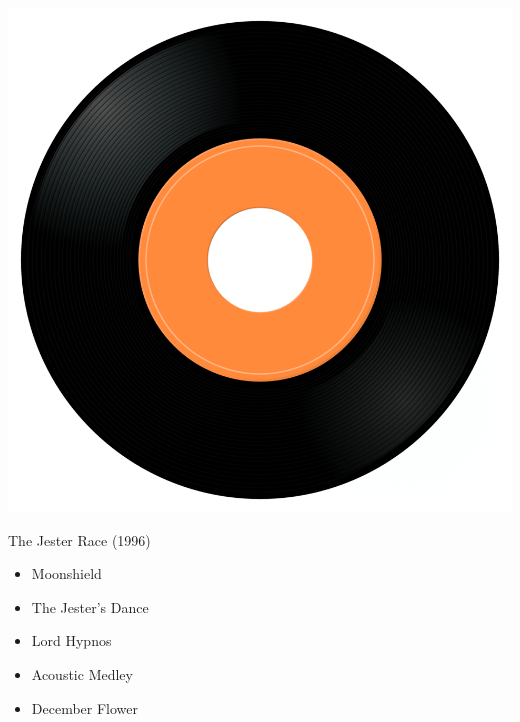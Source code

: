 \begin{minipage}[t]{0.25\textwidth}\vspace{0pt}
\captionsetup{type=figure}
\includegraphics[width=\textwidth]{Images/cover.png}
\caption*{The Jester Race (1996)}
\end{minipage}
\begin{minipage}[t]{0.25\textwidth}\vspace{0pt}
\begin{itemize}[nosep,leftmargin=1em,labelwidth=*,align=left]
	\setlength{\itemsep}{0pt}
	\item Moonshield
	\item The Jester's Dance
	\item Lord Hypnos
	\item Acoustic Medley
	\item December Flower
\end{itemize}
\end{minipage}
